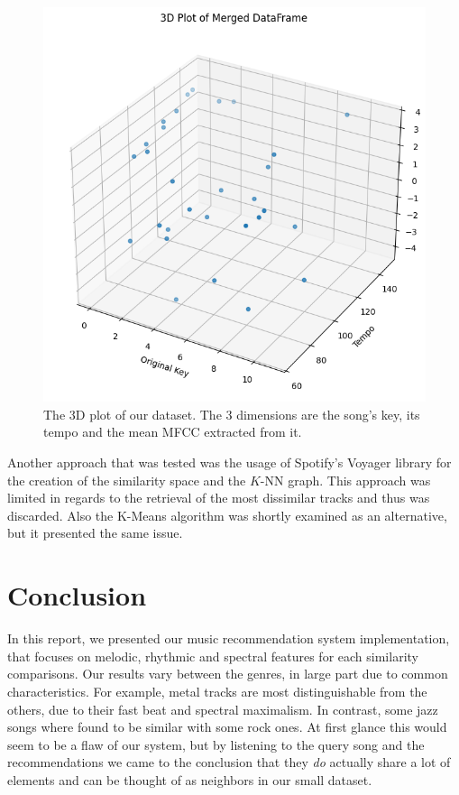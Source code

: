 \documentclass[
  letterpaper,
  twocolumn]{article}
\begin{document}
\begin{figure}
\centering
\includegraphics{./static/3d-plot.png}
\caption{The 3D plot of our dataset. The 3 dimensions are the song's
key, its tempo and the mean MFCC extracted from it.}\label{fig:3d-plot}
\end{figure}

Another approach that was tested was the usage of Spotify's Voyager
library \autocite{SpotifyVoyager2024} for the creation of the similarity
space and the \(K\)-NN graph. This approach was limited in regards to
the retrieval of the most dissimilar tracks and thus was discarded. Also
the K-Means algorithm was shortly examined as an alternative, but it
presented the same issue.

\section{Conclusion}\label{conclusion}

In this report, we presented our music recommendation system
implementation, that focuses on melodic, rhythmic and spectral features
for each similarity comparisons. Our results vary between the genres, in
large part due to common characteristics. For example, metal tracks are
most distinguishable from the others, due to their fast beat and
spectral maximalism. In contrast, some jazz songs where found to be
similar with some rock ones. At first glance this would seem to be a
flaw of our system, but by listening to the query song and the
recommendations we came to the conclusion that they \emph{do} actually
share a lot of elements and can be thought of as neighbors in our small
dataset.
\end{document}
